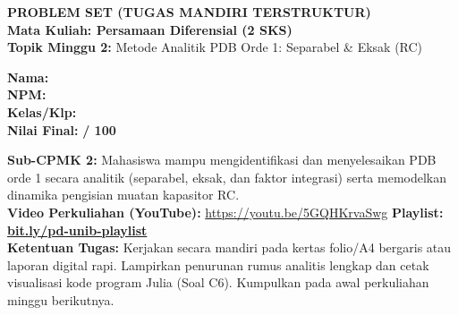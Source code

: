 \documentclass[10pt,a4paper]{article}
\begin{document}
\noindent\begin{minipage}[c]{0.68\textwidth}%
  {\large\textbf{\color{unibblue}PROBLEM SET (TUGAS MANDIRI TERSTRUKTUR)}}\\[1mm]
  {\normalsize\textbf{Mata Kuliah: Persamaan Diferensial (2 SKS)}}\\[0.5mm]
  {\small\textbf{Topik Minggu 2:} Metode Analitik PDB Orde 1: Separabel \& Eksak (RC)}%
\end{minipage}%
\hfill%
\begin{minipage}[c]{0.30\textwidth}%
  \begin{tcolorbox}[colback=unibblue!5,colframe=unibblue,boxrule=0.6pt,arc=2pt,left=4pt,right=4pt,top=2pt,bottom=2pt]
    \scriptsize
    \textbf{Nama:} \dotfill\\[1.2mm]
    \textbf{NPM:} \dotfill\\[1.2mm]
    \textbf{Kelas/Klp:} \dotfill\\[1.2mm]
    \textbf{Nilai Final:} \hfill \textbf{/ 100}
  \end{tcolorbox}%
\end{minipage}\par

\vspace{1.5mm}

\begin{tcolorbox}[colback=boxbg,colframe=unibgold!90!black,boxrule=0.6pt,arc=2pt,left=5pt,right=5pt,top=3pt,bottom=3pt,title=\textbf{\scriptsize Capaian Pembelajaran (Sub-CPMK 2) \& Pedoman Pengerjaan Tugas}]
  \scriptsize
  \textbf{Sub-CPMK 2:} Mahasiswa mampu mengidentifikasi dan menyelesaikan PDB orde 1 secara analitik (separabel, eksak, dan faktor integrasi) serta memodelkan dinamika pengisian muatan kapasitor RC.\\
  \textbf{Video Perkuliahan (YouTube):} \url{https://youtu.be/5GQHKrvaSwg} \hfill \textbf{Playlist:} \href{https://www.youtube.com/playlist?list=PLS5oOZWXZeTw}{\color{unibblue}\textbf{bit.ly/pd-unib-playlist}}\\\textbf{Ketentuan Tugas:} Kerjakan secara mandiri pada kertas folio/A4 bergaris atau laporan digital rapi. Lampirkan penurunan rumus analitis lengkap dan cetak visualisasi kode program Julia (Soal C6). Kumpulkan pada awal perkuliahan minggu berikutnya.
\end{tcolorbox}

\vspace{1.5mm}
\end{document}
